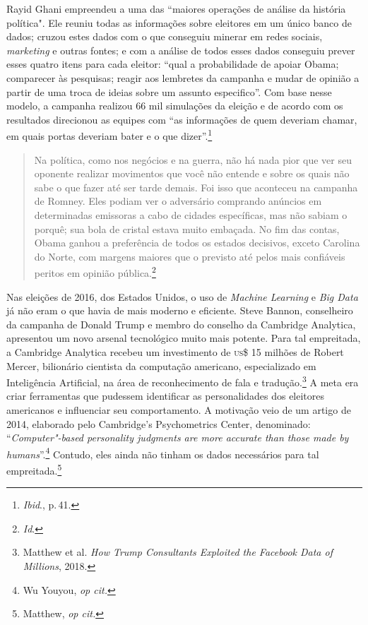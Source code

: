 Rayid Ghani empreendeu a uma das ``maiores operações de análise da
história política". Ele reuniu todas as informações sobre eleitores em
um único banco de dados; cruzou estes dados com o que conseguiu minerar
em redes sociais, \textit{marketing} e outras fontes; e com a análise de todos
esses dados conseguiu prever esses quatro itens para cada eleitor:
``qual a probabilidade de apoiar Obama; comparecer às pesquisas; reagir
aos lembretes da campanha e mudar de opinião a partir de uma troca de
ideias sobre um assunto especifico''. Com base nesse modelo, a campanha
realizou 66 mil simulações da eleição e de acordo com os resultados
direcionou as equipes com ``as informações de quem deveriam chamar, em
quais portas deveriam bater e o que dizer''.\footnote{\textit{Ibid}., p.\,41.}

\begin{quote}
Na política, como nos negócios e na guerra, não há nada pior que ver seu
oponente realizar movimentos que você não entende e sobre os quais não
sabe o que fazer até ser tarde demais. Foi isso que aconteceu na
campanha de Romney. Eles podiam ver o adversário comprando anúncios em
determinadas emissoras a cabo de cidades específicas, mas não sabiam o
porquê; sua bola de cristal estava muito embaçada. No fim das contas,
Obama ganhou a preferência de todos os estados decisivos, exceto
Carolina do Norte, com margens maiores que o previsto até pelos mais
confiáveis peritos em opinião pública.\footnote{\textit{Id}.}
\end{quote}

Nas eleições de 2016, dos Estados Unidos, o uso de \textit{Machine
Learning} e \textit{Big Data} já não eram o que havia de mais moderno e
eficiente. Steve Bannon, conselheiro da campanha de Donald Trump e
membro do conselho da Cambridge Analytica, apresentou um novo arsenal
tecnológico muito mais potente. Para tal empreitada, a Cambridge
Analytica recebeu um investimento de \textsc{us}\$ 15 milhões de Robert Mercer,
bilionário cientista da computação americano, especializado em
Inteligência Artificial, na área de reconhecimento de fala e tradução.\footnote{Matthew et al. \textit{How Trump Consultants Exploited the
Facebook Data of Millions}, 2018.} A meta era criar ferramentas que pudessem identificar as personalidades dos eleitores
americanos e influenciar seu comportamento. A motivação veio de um
artigo de 2014, elaborado pelo Cambridge's Psychometrics Center,
denominado: ``\textit{Computer"-based personality judgments are more
accurate than those made by humans}''.\footnote{Wu Youyou, \textit{op cit.}} Contudo, eles
ainda não tinham os dados necessários para tal empreitada.\footnote{Matthew, \textit{op cit.}}

